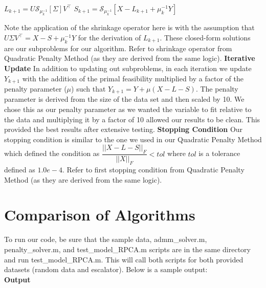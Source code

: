 \documentclass[12pt]{article}
\begin{document}
\begin{center}
    $L_{k+1} = U\mathcal{S}_{\mu_k^{-1}}[\Sigma]V^\top$
    \newline
    $S_{k+1} = \mathcal{S}_{\mu_k^{-1}}[X - L_{k+1} + \mu_k^{-1} Y]$
    \newline
\end{center}
Note the application of the shrinkage operator here is with the assumption that $U \Sigma V^\top = X - S + \mu_k^{-1} Y$ for the derivation of $L_{k+1}$. These closed-form solutions are our subproblems for our algorithm. Refer to shrinkage operator from Quadratic Penalty Method (as they are derived from the same logic).
\newline
\textbf{Iterative Update}
\newline
In addition to updating out subproblems, in each iteration we update $Y_{k+1}$ with the addition of the primal feasibility multiplied by a factor of the penalty parameter ($\mu$) such that $Y_{k+1} = Y + \mu (X - L - S)$. The penalty parameter is derived from the size of the data set and then scaled by 10. We chose this as our penalty parameter as we wanted the variable to fit relative to the data and multiplying it by a factor of 10 allowed our results to be clean. This provided the best results after extensive testing.
\newline
\textbf{Stopping Condition}
\newline
Our stopping condition is similar to the one we used in our Quadratic Penalty Method which defined the condition as $\dfrac{||X - L - S||_F}{||X||_F} < tol$ where $tol$ is a tolerance defined as $1.0e-4$. Refer to first stopping condition from Quadratic Penalty Method (as they are derived from the same logic).
\newpage


\section*{Comparison of Algorithms}
To run our code, be sure that the sample data, admm\_solver.m,  penalty\_solver.m, and test\_model\_RPCA.m scripts are in the same directory and run test\_model\_RPCA.m. This will call both scripts for both provided datasets (random data and escalator). Below is a sample output:
\\
\textbf{Output}\\ \\
\end{document}
